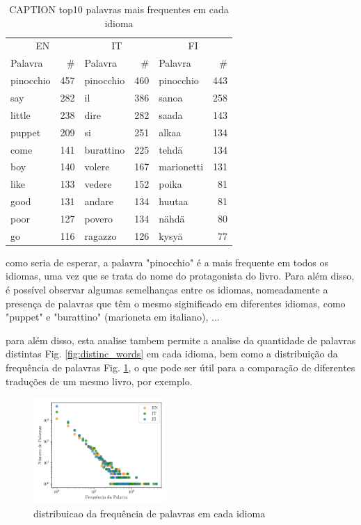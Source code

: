 \documentclass[mirror, portugues]{revdetua}
\begin{document}
\begin{table}[H]
\centering
\caption{CAPTION top10 palavras mais frequentes em cada idioma}
\label{table:top10_exatos}
\begin{tabular}{lr|lr|lr}
\toprule
\multicolumn{2}{c}{EN} & \multicolumn{2}{c}{IT} & \multicolumn{2}{c}{FI} \\
Palavra & \# & Palavra & \# & Palavra & \# \\
\midrule
pinocchio & 457 & pinocchio & 460 & pinocchio & 443 \\
say & 282 & il & 386 & sanoa & 258 \\
little & 238 & dire & 282 & saada & 143 \\
puppet & 209 & si & 251 & alkaa & 134 \\
come & 141 & burattino & 225 & tehdä & 134 \\
boy & 140 & volere & 167 & marionetti & 131 \\
like & 133 & vedere & 152 & poika & 81 \\
good & 131 & andare & 134 & huutaa & 81 \\
poor & 127 & povero & 134 & nähdä & 80 \\
go & 116 & ragazzo & 126 & kysyä & 77 \\
\bottomrule
\end{tabular}
\end{table}


como seria de esperar, a palavra "pinocchio" é a mais frequente em todos os idiomas, uma vez que se trata do nome do protagonista do livro. Para além disso, é possível observar algumas semelhanças entre os idiomas, nomeadamente a presença de palavras que têm o mesmo siginificado em diferentes idiomas, como "puppet" e "burattino" (marioneta em italiano), ...

para além disso, esta analise tambem permite a analise da quantidade de palavras distintas Fig. \ref{fig:distinc_words} em cada idioma, bem como a distribuição da frequência de palavras Fig. \ref{fig:word_freqs}, o que pode ser útil para a comparação de diferentes traduções de um mesmo livro, por exemplo.

\begin{figure}[H]
    \centering
    \includegraphics[width=0.45\textwidth]{../assets/exact_word_freqs.png}
    \caption{distribuicao da frequência de palavras em cada idioma}
    \label{fig:word_freqs}
\end{figure}
\end{document}
